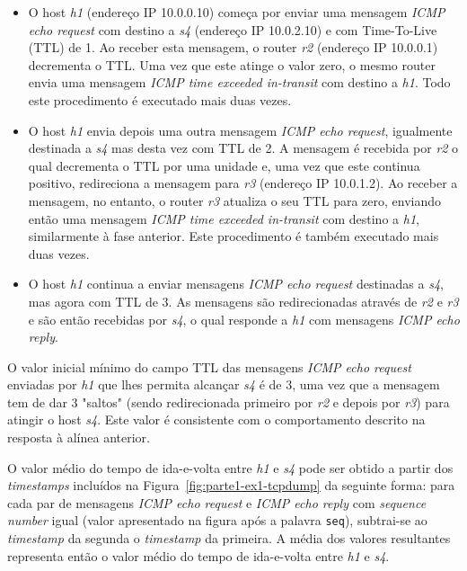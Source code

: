 \begin{itemize}

  \item O host \emph{h1} (endereço IP 10.0.0.10) começa por enviar uma mensagem
  \emph{ICMP echo request} com destino a \emph{s4} (endereço IP 10.0.2.10) e com
  Time-To-Live (TTL) de 1. Ao receber esta mensagem, o router \emph{r2}
  (endereço IP 10.0.0.1) decrementa o TTL. Uma vez que este atinge o valor zero,
  o mesmo router envia uma mensagem \emph{ICMP time exceeded in-transit} com
  destino a \emph{h1}. Todo este procedimento é executado mais duas vezes.

  \item O host \emph{h1} envia depois uma outra mensagem \emph{ICMP echo
  request}, igualmente destinada a \emph{s4} mas desta vez com TTL de 2. A
  mensagem é recebida por \emph{r2} o qual decrementa o TTL por uma unidade e,
  uma vez que este continua positivo, redireciona a mensagem para \emph{r3}
  (endereço IP 10.0.1.2). Ao receber a mensagem, no entanto, o router \emph{r3}
  atualiza o seu TTL para zero, enviando então uma mensagem \emph{ICMP time
  exceeded in-transit} com destino a \emph{h1}, similarmente à fase anterior.
  Este procedimento é também executado mais duas vezes.

  \item O host \emph{h1} continua a enviar mensagens \emph{ICMP echo
  request} destinadas a \emph{s4}, mas agora com TTL de 3. As mensagens são
  redirecionadas através de \emph{r2} e \emph{r3} e são então recebidas por
  \emph{s4}, o qual responde a \emph{h1} com mensagens \emph{ICMP echo reply}.

\end{itemize}


O valor inicial mínimo do campo TTL das mensagens \emph{ICMP echo request}
enviadas por \emph{h1} que lhes permita alcançar \emph{s4} é de 3, uma vez que a
mensagem tem de dar 3 "saltos" (sendo redirecionada primeiro por \emph{r2} e
depois por \emph{r3}) para atingir o host \emph{s4}. Este valor é consistente
com o comportamento descrito na resposta à alínea anterior.


O valor médio do tempo de ida-e-volta entre \emph{h1} e \emph{s4} pode ser
obtido a partir dos \emph{timestamps} incluídos na
Figura~\ref{fig:parte1-ex1-tcpdump} da seguinte forma: para cada par de
mensagens \emph{ICMP echo request} e \emph{ICMP echo reply} com \emph{sequence
number} igual (valor apresentado na figura após a palavra \texttt{seq}),
subtrai-se ao \emph{timestamp} da segunda o \emph{timestamp} da primeira. A
média dos valores resultantes representa então o valor médio do tempo de
ida-e-volta entre \emph{h1} e \emph{s4}.


